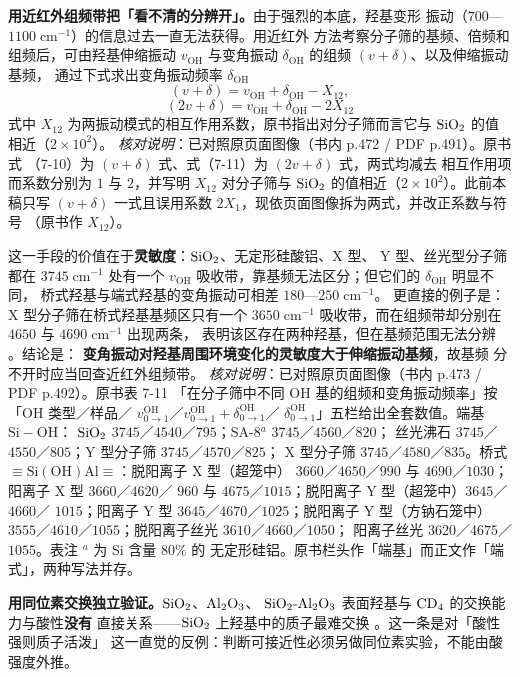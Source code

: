\begin{crosscheck}
\textbf{用近红外组频带把「看不清的分辨开」。}由于强烈的本底，羟基变形
振动（$700$—$1100\;\mathrm{cm^{-1}}$）的信息过去一直无法获得。用近红外
方法考察分子筛的基频、倍频和组频后，可由羟基伸缩振动 $v_{\mathrm{OH}}$
与变角振动 $\delta_{\mathrm{OH}}$ 的组频 $(v+\delta)$、以及伸缩振动基频，
通过下式求出变角振动频率 $\delta_{\mathrm{OH}}$
\begin{equation}
  (v+\delta)=v_{\mathrm{OH}}+\delta_{\mathrm{OH}}-X_{12},
  \label{eq:ch07b-combination}
\end{equation}
\begin{equation}
  (2v+\delta)=v_{\mathrm{OH}}+\delta_{\mathrm{OH}}-2X_{12}
\end{equation}
式中 $X_{12}$ 为两振动模式的相互作用系数，原书指出对分子筛而言它与
$\ce{SiO2}$ 的值相近（$2\times10^{2}$）。
\emph{核对说明}：已对照原页面图像（书内 p.472 / PDF p.491）。原书式
（7-10）为 $(v+\delta)$ 式、式（7-11）为 $(2v+\delta)$ 式，两式均减去
相互作用项而系数分别为 $1$ 与 $2$，并写明 $X_{12}$ 对分子筛与
$\ce{SiO2}$ 的值相近（$2\times10^{2}$）。此前本稿只写 $(v+\delta)$
一式且误用系数 $2X_{1}$，现依页面图像拆为两式，并改正系数与符号
（原书作 $X_{12}$）。

这一手段的价值在于\textbf{灵敏度}：$\ce{SiO2}$、无定形硅酸铝、X 型、
Y 型、丝光型分子筛都在 $3745\;\mathrm{cm^{-1}}$ 处有一个 $v_{\mathrm{OH}}$
吸收带，靠基频无法区分；但它们的 $\delta_{\mathrm{OH}}$ 明显不同，
桥式羟基与端式羟基的变角振动可相差 $180$—$250\;\mathrm{cm^{-1}}$。
更直接的例子是：X 型分子筛在桥式羟基基频区只有一个 $3650\;\mathrm{cm^{-1}}$
吸收带，而在组频带却分别在 $4650$ 与 $4690\;\mathrm{cm^{-1}}$ 出现两条，
表明该区存在两种羟基，但在基频范围无法分辨
。结论是：
\textbf{变角振动对羟基周围环境变化的灵敏度大于伸缩振动基频}，故基频
分不开时应当回查近红外组频带。
\emph{核对说明}：已对照原页面图像（书内 p.473 / PDF p.492）。原书表 7-11
「在分子筛中不同 OH 基的组频和变角振动频率」按「OH 类型／样品／
$v^{\mathrm{OH}}_{0\to1}$／$v^{\mathrm{OH}}_{0\to1}+\delta^{\mathrm{OH}}_{0\to1}$／
$\delta^{\mathrm{OH}}_{0\to1}$」五栏给出全套数值。端基 $\mathrm{Si{-}OH}$：
$\ce{SiO2}$ $3745$／$4540$／$795$；SA-8$^{a}$ $3745$／$4560$／$820$；
丝光沸石 $3745$／$4550$／$805$；Y 型分子筛 $3745$／$4570$／$825$；
X 型分子筛 $3745$／$4580$／$835$。桥式
$\equiv\!\mathrm{Si(OH)Al}\equiv$：脱阳离子 X 型（超笼中）
$3660$／$4650$／$990$ 与 $4690$／$1030$；阳离子 X 型 $3660$／$4620$／
$960$ 与 $4675$／$1015$；脱阳离子 Y 型（超笼中）$3645$／$4660$／
$1015$；阳离子 Y 型 $3645$／$4670$／$1025$；脱阳离子 Y 型（方钠石笼中）
$3555$／$4610$／$1055$；脱阳离子丝光 $3610$／$4660$／$1050$；
阳离子丝光 $3620$／$4675$／$1055$。表注 $^{a}$ 为 Si 含量 $80\%$ 的
无定形硅铝。原书栏头作「端基」而正文作「端式」，两种写法并存。

\textbf{用同位素交换独立验证。}$\ce{SiO2}$、$\ce{Al2O3}$、
$\ce{SiO2{-}Al2O3}$ 表面羟基与 $\ce{CD4}$ 的交换能力与酸性\textbf{没有}
直接关系——$\ce{SiO2}$ 上羟基中的质子最难交换
。这一条是对「酸性强则质子活泼」
这一直觉的反例：判断可接近性必须另做同位素实验，不能由酸强度外推。
\end{crosscheck}

